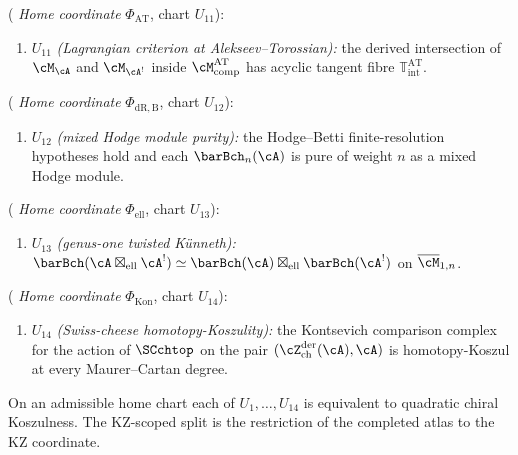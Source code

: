 \begin{theorem}
\smallskip
\noindent\textup{(} \emph{Home coordinate}
$\Phi_{\mathrm{AT}}$, chart $U_{11}$\textup{):}
\begin{enumerate}[label=\textup{(\roman*)},resume,leftmargin=2.4em]
\item $U_{11}$ \emph{(Lagrangian criterion at
 Alekseev--Torossian):} the derived intersection of
 $\cM_\cA$ and $\cM_{\cA^!}$ inside
 $\cM^{\mathrm{AT}}_{\mathrm{comp}}$ has acyclic tangent fibre
 $\mathbb T^{\mathrm{AT}}_{\mathrm{int}}$.
\end{enumerate}

\smallskip
\noindent\textup{(} \emph{Home coordinate}
$\Phi_{\mathrm{dR,B}}$, chart $U_{12}$\textup{):}
\begin{enumerate}[label=\textup{(\roman*)},resume,leftmargin=2.4em]
\item $U_{12}$ \emph{(mixed Hodge module purity):}
 the Hodge--Betti finite-resolution hypotheses hold and each
 $\barBch_n(\cA)$ is pure of weight $n$ as a mixed Hodge module.
\end{enumerate}

\smallskip
\noindent\textup{(} \emph{Home coordinate}
$\Phi_{\mathrm{ell}}$, chart $U_{13}$\textup{):}
\begin{enumerate}[label=\textup{(\roman*)},resume,leftmargin=2.4em]
\item $U_{13}$ \emph{(genus-one twisted K\"unneth):}
 $\barBch(\cA \boxtimes_{\mathrm{ell}} \cA^!) \simeq
 \barBch(\cA) \boxtimes_{\mathrm{ell}} \barBch(\cA^!)$
 on $\overline{\cM}_{1,n}$.
\end{enumerate}

\smallskip
\noindent\textup{(} \emph{Home coordinate}
$\Phi_{\mathrm{Kon}}$, chart $U_{14}$\textup{):}
\begin{enumerate}[label=\textup{(\roman*)},resume,leftmargin=2.4em]
\item $U_{14}$ \emph{(Swiss-cheese homotopy-Koszulity):}
 the Kontsevich comparison complex for the action of
 $\SCchtop$ on the pair
 $(\cZ^{\mathrm{der}}_{\mathrm{ch}}(\cA),\cA)$ is
 homotopy-Koszul at every Maurer--Cartan degree.
\end{enumerate}

On an admissible home chart each of $U_1,\ldots,U_{14}$ is
equivalent to quadratic chiral Koszulness. The KZ-scoped split is
the restriction of the completed atlas to the KZ coordinate.
\end{theorem}

